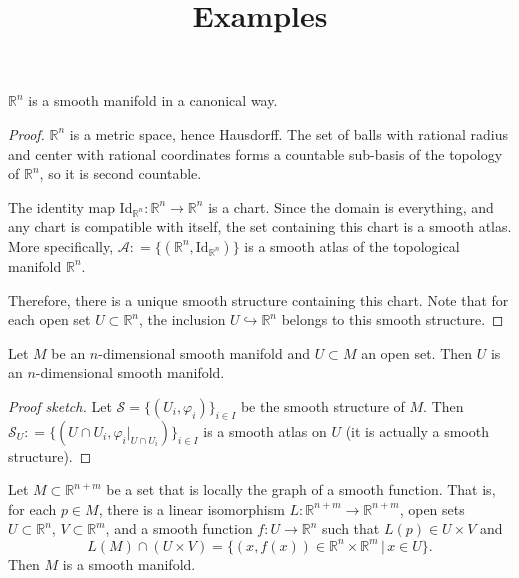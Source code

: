 \documentclass{ximera}
\title{Examples}
\begin{document}
    \begin{abstract}   \end{abstract}
    \maketitle

\begin{example}
$\mathbb{R}^n$ is a smooth manifold in a canonical way. %
\end{example}

\begin{proof}
    $\mathbb{R}^n$ is a metric space,  hence Hausdorff.   The set of balls with rational radius and center with rational coordinates forms a countable sub-basis of the topology of $\mathbb{R}^n$, so it is second countable. 
    
    The identity map $\text{Id}_{\mathbb{R}^n} : \mathbb{R}^n \to \mathbb{R}^n$ is a chart. Since the domain is everything, and any chart is compatible with itself, the set containing this chart is a smooth atlas. More specifically, $\mathcal{A} : = \{ (\mathbb{R}^n, \text{Id}_{\mathbb{R}^n} ) \}$ is a smooth atlas of the topological manifold $\mathbb{R}^n$. 
    
    Therefore, there is a unique smooth structure containing this chart. Note that for each open set $U \subset \mathbb{R}^n$, the inclusion $U \hookrightarrow \mathbb{R}^n$ belongs to this smooth structure.
\end{proof}



\begin{example}
Let $M$ be an $n$-dimensional smooth manifold and $U \subset M$ an open set. Then $U$ is an $n$-dimensional smooth manifold. 
\end{example}

\begin{proof}[Proof sketch]
    Let $\mathcal{S} = \{ (U_i, \varphi _i ) \} _{i \in I }$ be the smooth structure of $M$. Then $\mathcal{S}_U : = \{ ( U \cap U_i , \varphi_i \vert _{U \cap U_i}  ) \} _{i \in I }$ is a smooth atlas on $U$ (it is actually a smooth structure). 
\end{proof}


\begin{example} Let $M\subset \mathbb{R}^{n+m}$ be a set that is locally the graph of a smooth function. That is, for each $p \in M$, there is a linear isomorphism $L : \mathbb{R}^{n+m} \to \mathbb{R}^{n+m}$, open sets $U \subset \mathbb{R}^n $, $V \subset \mathbb{R}^m$, and a smooth function $f : U \to \mathbb{R}^n$ such that $L(p) \in U\times V$ and
\[      L (M) \cap ( U \times V  ) = \{ (x,f(x)) \in \mathbb{R}^n \times \mathbb{R}^m  \, \vert \,  x \in U \}  . \]
Then $M$ is a smooth manifold. 
\end{example}
\end{document}
